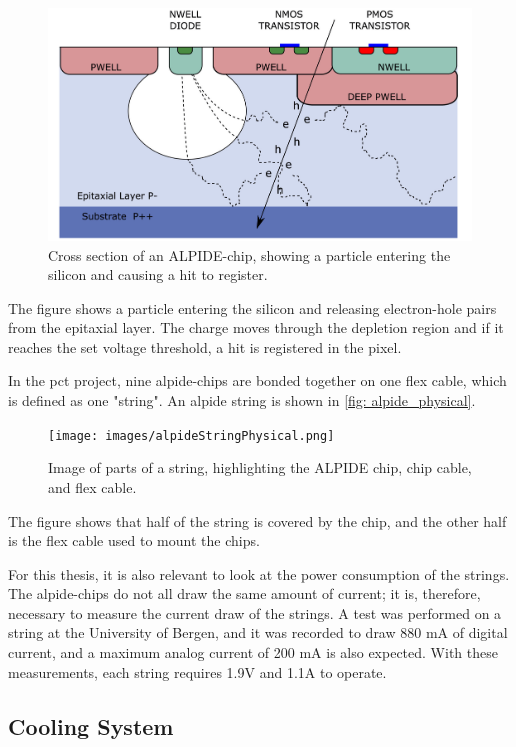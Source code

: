 \documentclass[main.tex]{subfiles}
\begin{document}
\begin{figure}[!htpb]
    \centering
    \includegraphics[width=12cm]{images/alpide_chip.jpg}
    \caption{Cross section of an ALPIDE-chip, showing a particle entering the silicon and causing a hit to register.}
    \label{fig: alpide_cross}
\end{figure}
\FloatBarrier


The figure shows a particle entering the silicon and releasing electron-hole pairs from the epitaxial layer. The charge moves through the depletion region and if it reaches the set voltage threshold, a hit is registered in the pixel.

In the \gls{pct} project, nine \gls{alpide}-chips are bonded together on one flex cable, which is defined as one "string". An \gls{alpide} string is shown in \autoref{fig: alpide_physical}.

\begin{figure}[!htpb]
    \centering
    \texttt{[image: images/alpideStringPhysical.png]}
    \caption{Image of parts of a string, highlighting the ALPIDE chip, chip cable, and flex cable.}
    \label{fig: alpide_physical}
\end{figure}
\FloatBarrier

The figure shows that half of the string is covered by the chip, and the other half is the flex cable used to mount the chips.

For this thesis, it is also relevant to look at the power consumption of the strings. The \gls{alpide}-chips do not all draw the same amount of current; it is, therefore, necessary to measure the current draw of the strings. A test was performed on a string at the University of Bergen, and it was recorded to draw 880 mA of digital current, and a maximum analog current of 200 mA is also expected. With these measurements, each string requires 1.9V and 1.1A to operate. 


\subsection{Cooling System}
\end{document}

